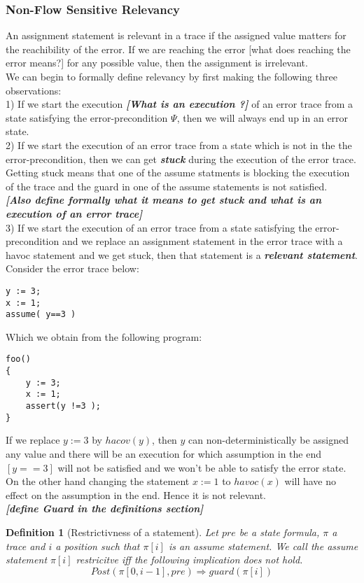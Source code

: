 \documentclass{article}
\newtheorem{mydef}{Definition}
\begin{document}
\subsubsection{Non-Flow Sensitive Relevancy}
An assignment statement is relevant in a trace if the assigned value matters for the reachibility of the error. If we are reaching the error [what does reaching the error means?] for any possible value, then the assignment is irrelevant.\\
We can begin to formally define relevancy by first making the following three observations:\\
1) If we start the execution \textbf{\textit{[What is an execution ?]}} of an error trace from a state satisfying the error-precondition $\Psi$, then we will always end up in an error state. \\
2) If we start the execution of an error trace from a state which is not in the the error-precondition, then we can get \textit{\textbf{stuck}} during the execution of the error trace. Getting stuck means that one of the assume statments is blocking the execution of the trace and the guard in one of the assume statements is not satisfied. \\
\textbf{\textit{[Also define formally what it means to get stuck and what is an execution of an error trace]}}\\
3) If we start the execution of an error trace from a state satisfying the error-precondition and we replace an assignment statement in the error trace with a havoc statement and we get stuck, then that statement is a \textit{\textbf{relevant statement}}.\\
Consider the error trace below:
\begin{lstlisting}
y := 3;
x := 1;
assume( y==3 )
\end{lstlisting}
Which we obtain from the following program:
\begin{lstlisting}
foo()
{
	y := 3;
	x := 1;
	assert(y !=3 );
}
\end{lstlisting}
If we replace $y:=3$ by $hacov(y)$, then $y$ can non-deterministically be assigned any value and there will be an execution for which assumption in the end $[y==3]$ will not be satisfied and we won't be able to satisfy the error state.\\
On the other hand changing the statement $x := 1$ to $havoc(x)$ will have no effect on the assumption in the end. Hence it is not relevant.\\
\textit{\textbf{[define Guard in the definitions section]}}
\begin{mydef}[Restrictivness of a statement]
Let $pre$ be a state formula, $\pi$ a trace and $i$ a position such that $\pi[i]$ is an assume statement. We call the assume statement $\pi[i]$ \emph{restricitve} iff the following implication does not hold.
$$Post(\pi[0,i-1], pre) \Rightarrow guard(\pi[i])$$
\end{mydef}
\end{document}
